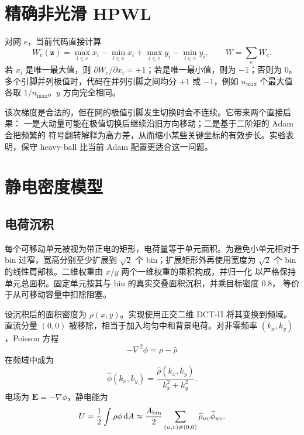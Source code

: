 \documentclass[UTF8,fontset=windows,a4paper,11pt]{ctexart}
\begin{document}
\section{精确非光滑 HPWL}

对网 $e$，当前代码直接计算
\begin{equation}
 W_e(\bm z)=\max_{i\in e}x_i-\min_{i\in e}x_i+
             \max_{i\in e}y_i-\min_{i\in e}y_i,
 \qquad W=\sum_e W_e.
\end{equation}
若 $x_i$ 是唯一最大值，则 $\partial W_e/\partial x_i=+1$；若是唯一最小值，则为
$-1$；否则为 0。多个引脚并列极值时，代码在并列引脚之间均分 $+1$ 或 $-1$，例如
$n_{\max}$ 个最大值各取 $1/n_{\max}$。$y$ 方向完全相同。

该次梯度是合法的，但在网的极值引脚发生切换时会不连续。它带来两个直接后果：
一是大动量可能在极值切换后继续沿旧方向移动；二是基于二阶矩的 Adam 会把频繁的
符号翻转解释为高方差，从而缩小某些关键坐标的有效步长。实验表明，保守 heavy-ball
比当前 Adam 配置更适合这一问题。

\section{静电密度模型}

\subsection{电荷沉积}

每个可移动单元被视为带正电的矩形，电荷量等于单元面积。为避免小单元相对于 bin
过窄，宽高分别至少扩展到 $\sqrt{2}$ 个 bin；扩展矩形外再使用宽度为
$\sqrt{2}$ 个 bin 的线性肩部核。二维权重由 $x/y$ 两个一维权重的乘积构成，并归一化
以严格保持单元总面积。固定单元按其与 bin 的真实交叠面积沉积，并乘目标密度 0.8，
等价于从可移动容量中扣除阻塞。

设沉积后的面积密度为 $\rho(x,y)$。实现使用正交二维 DCT-II 将其变换到频域。
直流分量 $(0,0)$ 被移除，相当于加入均匀中和背景电荷。对非零频率
$(k_x,k_y)$，Poisson 方程
\begin{equation}
 -\nabla^2\phi=\rho-\bar\rho
\end{equation}
在频域中成为
\begin{equation}
 \widehat\phi(k_x,k_y)=
 \frac{\widehat\rho(k_x,k_y)}{k_x^2+k_y^2}.
\end{equation}
电场为 $\bm E=-\nabla\phi$，静电能为
\begin{equation}
 U=\frac{1}{2}\int \rho\phi\,\mathrm dA
   \approx \frac{A_{\rm bin}}{2}
   \sum_{(u,v)\ne(0,0)}\widehat\rho_{uv}\widehat\phi_{uv}.
\end{equation}
\end{document}
